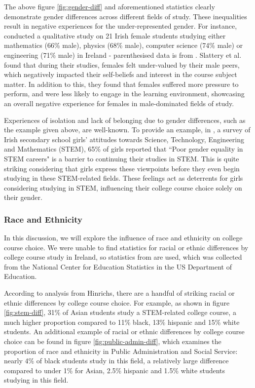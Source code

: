 The above figure \ref{fig:gender-diff} and aforementioned statistics clearly demonstrate gender differences across different fields of study.
These inequalities result in negative experiences for the under-represented gender.
For instance, \cite{slattery2023navigating} conducted a qualitative study on 
21 Irish female students studying either mathematics (66\% male), physics (68\% male), computer science (74\% male) or engineering (71\% male)
in Ireland - parenthesised data is from \cite{hea2024key}.
Slattery et al. found that during their studies, females felt under-valued by their male peers,
which negatively impacted their self-beliefs and interest in the course subject matter.
In addition to this, they found that females suffered more pressure to perform, 
and were less likely to engage in the learning environment,
showcasing an overall negative experience for females in male-dominated fields of study.

Experiences of isolation and lack of belonging due to gender differences, such as the example given above, are well-known.
To provide an example, in \cite{iwish2025survey}, a survey of Irish secondary school girls' attitudes towards Science, Technology, Engineering and Mathematics (STEM),
65\% of girls reported that ``Poor gender equality in STEM careers" is a barrier to continuing their studies in STEM.
This is quite striking considering that girls express these viewpoints before they even begin studying in these STEM-related fields.
These feelings act as deterrents for girls considering studying in STEM, influencing their college course choice solely on their gender.

\subsubsection{Race and Ethnicity}

In this discussion, we will explore the influence of race and ethnicity on college course choice.
We were unable to find statistics for racial or ethnic differences by college course study in Ireland,
so statistics from \cite{racial2015peter} are used, which was collected from the National Center for Education Statistics in the US Department of Education.

According to analysis from Hinrichs, there are a handful of striking racial or ethnic differences by college course choice.
For example, as shown in figure \ref{fig:stem-diff}, 31\% of Asian students study a STEM-related college course,
a much higher proportion compared to 11\% black, 13\% hispanic and 15\% white students.
An additional example of racial or ethnic differences by college course choice can be found in figure \ref{fig:public-admin-diff},
which examines the proportion of race and ethnicity in Public Administration and Social Service:
nearly 4\% of black students study in this field, a relatively large difference compared to under 1\% for Asian,
2.5\% hispanic and 1.5\% white students studying in this field.

